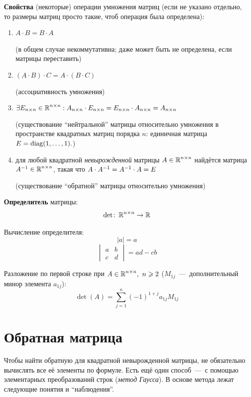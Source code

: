 \documentclass[a4paper,12pt]{article}
\begin{document}
    \textbf{Свойства} (некоторые) операции умножения матриц (если не указано отдельно, то размеры матриц просто такие, чтоб операция была определена):
    \begin{enumerate}
      \item \sout{$A \cdot B = B \cdot A$}
      
      (в общем случае некоммутативна; даже может быть не определена, если матрицы переставить)
      
      \item $(A \cdot B) \cdot C = A \cdot (B \cdot C)$
      
      (ассоциативность умножения)
      
      \item $\exists E_{n\times n} \in \operatorname{\mathbb R}^{n\times n}: A_{n\times n} \cdot E_{n\times n} = E_{n\times n} \cdot A_{n\times n} = A_{n\times n}$
      
      (существование ``нейтральной'' матрицы относительно умножения в пространстве квадратных матриц порядка $n$: единичная матрица $E \hm= \diag(1, \ldots, 1).$)
      
      \item для любой квадратной \emph{невырожденной} матрицы $A \hm\in \RR^{n\times n}$ найдётся матрица $A^{-1} \hm\in \RR^{n\times n}$, такая что $A \hm\cdot A^{-1} = A^{-1} \hm\cdot A = E$
      
      (существование ``обратной'' матрицы относительно умножения)
    \end{enumerate}
    
    \textbf{Определитель} матрицы:
    \[
      \det\colon \operatorname{\mathbb R}^{n\times n} \to \operatorname{\mathbb R}
    \]
    
    Вычисление определителя:
    \[
      |a| = a
    \]
    \[
      \begin{vmatrix}
        a & b\\
        c & d
      \end{vmatrix} = ad - cb
    \]
    
    Разложение по первой строке при $A \hm\in \RR^{n\times n},\ n \hm\geq 2$ ($M_{1j}$~---~дополнительный минор элемента $a_{1j}$):
    \[
      \det(A) = \sum\limits_{j = 1}^n (-1)^{1 + j} a_{1j} M_{1j}
    \]
    
  
  
  \section{Обратная матрица}
    Чтобы найти обратную для квадратной невырожденной матрицы, не обязательно вычислять все её элементы по формуле.
    Есть ещё один способ~---~с помощью элементарных преобразований строк (\emph{метод Гаусса}).
    В основе метода лежат следующие понятия и ``наблюдения''.
    
\end{document}
